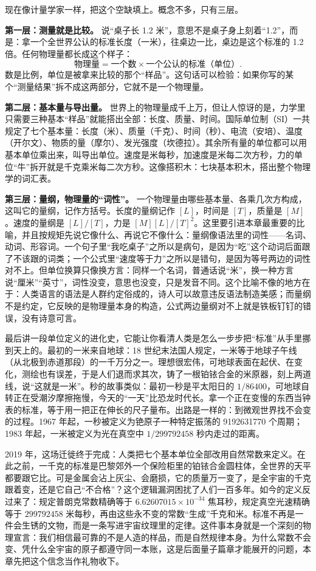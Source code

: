 
现在像计量学家一样，把这个空缺填上。概念不多，只有三层。

\textbf{第一层：测量就是比较。} 说“桌子长 1.2 米”，意思不是桌子身上刻着“1.2”，而是：拿一个全世界公认的标准长度（一米），往桌边一比，桌边是这个标准的 1.2 倍。任何物理量都长成这个样子：
\[
\text{物理量} = \text{一个数} \times \text{一个公认的标准（单位）}.
\]
数是比例，单位是被拿来比较的那个“样品”。这句话可以检验：如果你写的某个“测量结果”拆不成这两部分，它就不是一个物理量。

\textbf{第二层：基本量与导出量。} 世界上的物理量成千上万，但让人惊讶的是，力学里只需要三种基本“样品”就能搭出全部：长度、质量、时间。国际单位制（SI）一共规定了七个基本量：长度（米）、质量（千克）、时间（秒）、电流（安培）、温度（开尔文）、物质的量（摩尔）、发光强度（坎德拉）。其余所有量的单位都可以用基本单位乘出来，叫导出单位。速度是米每秒，加速度是米每二次方秒，力的单位“牛”拆开就是千克乘米每二次方秒。这像搭积木：七块基本积木，搭出整个物理学的词汇表。

\textbf{第三层：量纲，物理量的“词性”。} 一个物理量由哪些基本量、各乘几次方构成，这叫它的量纲，记作方括号。长度的量纲记作 $[L]$，时间是 $[T]$，质量是 $[M]$。速度的量纲是 $[L]/[T]$，力是 $[M][L]/[T]^2$。这里要引进本章最重要的比喻，并且按规矩先说它像什么、再说它不像什么：量纲像语法里的词性——名词、动词、形容词。一个句子里“我吃桌子”之所以是病句，是因为“吃”这个动词后面跟了不该跟的词类；一个公式里“速度等于力”之所以是错句，是因为等号两边的词性对不上。但单位换算只像换方言：同样一个名词，普通话说“米”，换一种方言说“厘米”“英寸”，词性没变，意思也没变，只是发音不同。这个比喻不像的地方在于：人类语言的语法是人群约定俗成的，诗人可以故意违反语法制造美感；而量纲不是约定，它反映的是物理量本身的构造，公式两边量纲对不上就是铁板钉钉的错误，没有诗意可言。

最后讲一段单位定义的进化史，它能让你看清人类是怎么一步步把“标准”从手里挪到天上的。最初的一米来自地球：18 世纪末法国人规定，一米等于地球子午线（从北极到赤道那段）的一千万分之一。理想很宏伟，可地球表面在起伏、在变化，测绘也有误差，于是人们退而求其次，铸了一根铂铱合金的米原器，刻上两道线，说“这就是一米”。秒的故事类似：最初一秒是平太阳日的 $1/86400$，可地球自转正在受潮汐摩擦拖慢，今天的“一天”比恐龙时代长。拿一个正在变慢的东西当钟表的标准，等于用一把正在伸长的尺子量布。出路是一样的：到微观世界找不会变的过程。1967 年起，一秒被定义为铯原子一种特定振荡的 9192631770 个周期；1983 年起，一米被定义为光在真空中 $1/299792458$ 秒内走过的距离。

2019 年，这场迁徙终于完成：人类把七个基本单位全部改用自然常数来定义。在此之前，一千克的标准是巴黎郊外一个保险柜里的铂铱合金圆柱体，全世界的天平都要跟它比。可是金属会沾上灰尘、会磨损，它的质量万一变了，是全宇宙的千克跟着变，还是它自己“不合格”？这个逻辑漏洞困扰了人们一百多年。如今的定义反过来了：规定普朗克常数精确等于 $6.62607015\times10^{-34}$ 焦耳秒，规定真空光速精确等于 $299792458$ 米每秒，再由这些永不变的常数“生成”千克和米。标准不再是一件会生锈的文物，而是一条写进宇宙纹理里的定律。这件事本身就是一个深刻的物理宣言：我们相信最可靠的不是人造的样品，而是自然规律本身。为什么常数不会变、凭什么全宇宙的原子都遵守同一本账，这是后面量子篇章才能展开的问题，本章先把这个信念当作礼物收下。

